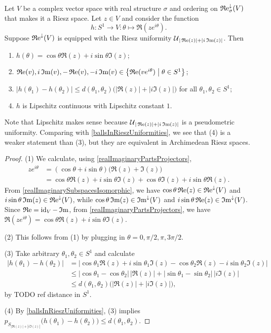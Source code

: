 \begin{lemma} \label{modulusConstructionLemma}
Let $V$ be a complex vector space with real structure $\sigma$ and ordering on $\operatorname{\mathfrak{R}e}^\downarrow_\sigma(V)$ that makes it a Riesz space.
Let $z\in V$ and consider the function
\[ h: S^1 \to V: \theta\mapsto \Re(ze^{i\theta}). \]
Suppose $\operatorname{\mathfrak{R}e}^\downarrow(V)$ is equipped with the Riesz uniformity $\operatorname{\mathcal{U}}_{|\operatorname{\mathfrak{R}e}(z)|+|i\operatorname{\mathfrak{I}m}(z)|}$. Then
\begin{enumerate}
\item $h(\theta) = \cos\theta\Re(z) + i\sin\theta\Im(z)$;
\item $\Re(v), i\Im(v), -\Re(v), -i\Im(v) \in \setbuilder{\Re(ve^{i\theta})}{\theta\in S^1}$;
\item $\big|h(\theta_1) - h(\theta_2)\big| \leq d(\theta_1, \theta_2)\big(|\Re(z)|+|i\Im(z)|\big)$ for all $\theta_1,\theta_2 \in S^1$;
\item $h$ is Lipschitz continuous with Lipschitz constant $1$.
\end{enumerate}
\end{lemma}
Note that Lipschitz makes sense because $\operatorname{\mathcal{U}}_{|\operatorname{\mathfrak{R}e}(z)|+|i\operatorname{\mathfrak{I}m}(z)|}$ is a pseudometric uniformity. Comparing with \ref{ballsInRieszUniformities}, we see that (4) is a weaker statement than (3), but they are equivalent in Archimedean Riesz spaces.
\begin{proof}
(1) We calculate, using \ref{realImaginaryPartsProjectors},
\begin{align*}
ze^{i\theta} &= (\cos\theta + i\sin\theta)\big(\Re(z) + \Im(z)\big) \\
&= \cos\theta \Re(z) + i\sin\theta \Im(z) + \cos\theta \Im(z) + i\sin\theta \Re(z).
\end{align*}
From \ref{realImaginarySubspacesIsomorphic}, we have $\cos\theta \operatorname{\mathfrak{R}e}(z)\in \operatorname{\mathfrak{R}e}^\downarrow(V)$ and $i\sin\theta \operatorname{\mathfrak{I}m}(z)\in \operatorname{\mathfrak{R}e}^\downarrow(V)$, while $\cos\theta \operatorname{\mathfrak{I}m}(z) \in \operatorname{\mathfrak{I}m}^\downarrow(V)$ and $i\sin\theta \operatorname{\mathfrak{R}e}(z) \in \operatorname{\mathfrak{I}m}^\downarrow(V)$. Since $\operatorname{\mathfrak{R}e} = \operatorname{id}_V - \operatorname{\mathfrak{I}m}$, from \ref{realImaginaryPartsProjectors}, we have $\Re(ze^{i\theta}) = \cos\theta \Re(z) + i\sin\theta \Im(z)$.

(2) This follows from (1) by plugging in $\theta = 0, \pi/2, \pi, 3\pi/2$.

(3) Take arbitrary $\theta_1, \theta_2 \in S^1$ and calculate
\begin{align*}
\big|h(\theta_1) - h(\theta_2)\big| &= \big|\cos\theta_1\Re(z) + i\sin\theta_1\Im(z) - \cos\theta_2\Re(z) - i\sin\theta_2\Im(z)\big| \\
&\leq |\cos\theta_1 - \cos\theta_2|\,|\Re(z)| + |\sin\theta_1 - \sin\theta_2|\,|i\Im(z)| \\
&\leq d(\theta_1, \theta_2)\big(|\Re(z)|+ |i\Im(z)|\big),
\end{align*}
by TODO ref distance in $S^1$.

(4) By \ref{ballsInRieszUniformities}, (3) implies $p_{S_{|\Re(z)|+ |i\Im(z)|}}\big(h(\theta_1) - h(\theta_2)\big) \leq d(\theta_1, \theta_2)$.
\end{proof}

